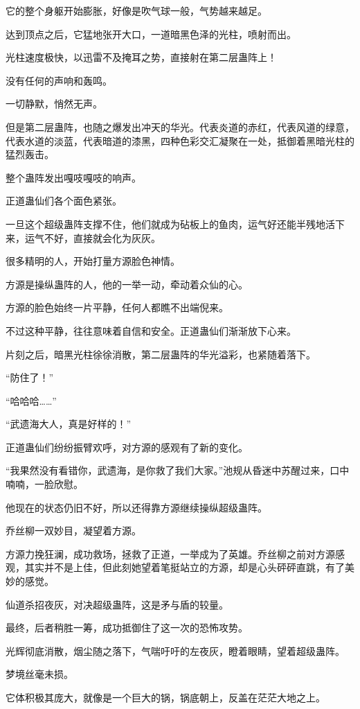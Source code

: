 \begin{this_body}
它的整个身躯开始膨胀，好像是吹气球一般，气势越来越足。

达到顶点之后，它猛地张开大口，一道暗黑色泽的光柱，喷射而出。

光柱速度极快，以迅雷不及掩耳之势，直接射在第二层蛊阵上！

没有任何的声响和轰鸣。

一切静默，悄然无声。

但是第二层蛊阵，也随之爆发出冲天的华光。代表炎道的赤红，代表风道的绿意，代表水道的淡蓝，代表暗道的漆黑，四种色彩交汇凝聚在一处，抵御着黑暗光柱的猛烈轰击。

整个蛊阵发出嘎吱嘎吱的响声。

正道蛊仙们各个面色紧张。

一旦这个超级蛊阵支撑不住，他们就成为砧板上的鱼肉，运气好还能半残地活下来，运气不好，直接就会化为灰灰。

很多精明的人，开始打量方源脸色神情。

方源是操纵蛊阵的人，他的一举一动，牵动着众仙的心。

方源的脸色始终一片平静，任何人都瞧不出端倪来。

不过这种平静，往往意味着自信和安全。正道蛊仙们渐渐放下心来。

片刻之后，暗黑光柱徐徐消散，第二层蛊阵的华光溢彩，也紧随着落下。

“防住了！”

“哈哈哈……”

“武遗海大人，真是好样的！”

正道蛊仙们纷纷振臂欢呼，对方源的感观有了新的变化。

“我果然没有看错你，武遗海，是你救了我们大家。”池规从昏迷中苏醒过来，口中喃喃，一脸欣慰。

他现在的状态仍旧不好，所以还得靠方源继续操纵超级蛊阵。

乔丝柳一双妙目，凝望着方源。

方源力挽狂澜，成功救场，拯救了正道，一举成为了英雄。乔丝柳之前对方源感观，其实并不是上佳，但此刻她望着笔挺站立的方源，却是心头砰砰直跳，有了美妙的感觉。

仙道杀招夜灰，对决超级蛊阵，这是矛与盾的较量。

最终，后者稍胜一筹，成功抵御住了这一次的恐怖攻势。

光辉彻底消散，烟尘随之落下，气喘吁吁的左夜灰，瞪着眼睛，望着超级蛊阵。

梦境丝毫未损。

它体积极其庞大，就像是一个巨大的锅，锅底朝上，反盖在茫茫大地之上。


\end{this_body}

